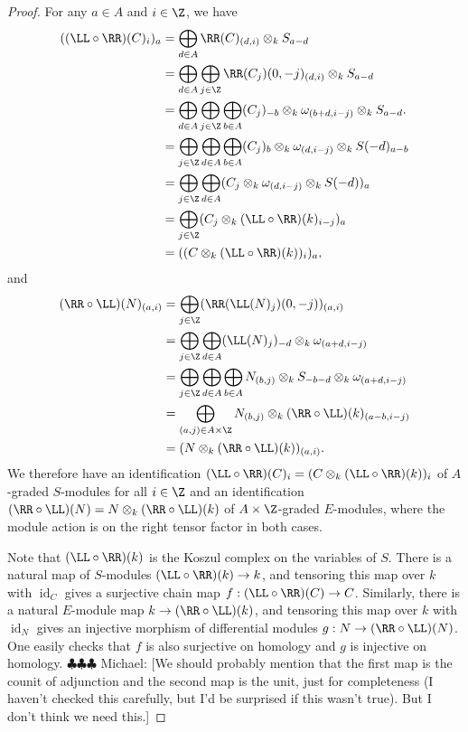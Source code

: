 \documentclass[12pt]{amsart}
\theoremstyle{definition}
\theoremstyle{remark}
\newcommand{\id}{\operatorname{id}}
\newcommand{\michael}[1]{{\color{red} \sf $\clubsuit\clubsuit\clubsuit$ Michael: [#1]}}
\def\om{\omega}
\def\om{\omega}
\begin{document}
\begin{proof}
For any $a \in A$ and $i \in \Z$, we have
\begin{align*}
((\LL \circ \RR)(C)_i)_a &= \bigoplus_{d \in A} \RR(C)_{(d, i)} \otimes_k S_{a - d} \\
&= \bigoplus_{d \in A} \bigoplus_{j \in \Z} \RR(C_j)(0, -j)_{(d, i)} \otimes_k S_{a - d} \\
&= \bigoplus_{d \in A} \bigoplus_{j \in \Z} \bigoplus_{b \in A} (C_j)_{-b} \otimes_k \om_{(b + d, i - j)} \otimes_k S_{a - d}. \\
&= \bigoplus_{j \in \Z} \bigoplus_{d \in A} \bigoplus_{b \in A} (C_j)_b \otimes_k   \om_{(d, i - j)} \otimes_k S(-d)_{a - b} \\
&= \bigoplus_{j \in \Z} \bigoplus_{d \in A} (C_j \otimes_k   \om_{(d, i - j)} \otimes_k S(-d))_a \\
&= \bigoplus_{j \in \Z} (C_j \otimes_k  (\LL \circ \RR)(k)_{i - j} )_a \\
&= ((C \otimes_k  (\LL \circ \RR)(k))_i)_a,
\end{align*}
and 
\begin{align*}
(\RR \circ \LL)(N)_{(a, i)} &= \bigoplus_{j \in \Z} (\RR(\LL(N)_j)(0, -j))_{(a, i)} \\
&= \bigoplus_{j \in \Z}  \bigoplus_{d \in A} (\LL(N)_j)_{-d} \otimes_k \om_{(a + d, i-j)} \\
&= \bigoplus_{j \in \Z}  \bigoplus_{d \in A} \bigoplus_{b \in A} N_{(b,j)} \otimes_k S_{-b-d} \otimes_k \om_{(a + d, i-j)} \\
&= \bigoplus_{(a,j) \in A \times \Z} N_{(b,j)} \otimes_k (\RR \circ \LL)(k)_{(a-b,i-j)} \\
&= (N \otimes_k (\RR \circ \LL)(k))_{(a, i)}.
\end{align*}
We therefore have an identification $(\LL \circ \RR)(C)_i = (C \otimes_k  (\LL \circ \RR)(k))_i$ of $A$-graded $S$-modules for all $i \in \Z$ and an identification $(\RR \circ \LL)(N) = N \otimes_k (\RR \circ \LL)(k)$ of $A \times \Z$-graded $E$-modules, where the module action is on the right tensor factor in both cases.

Note that $(\LL \circ \RR)(k)$ is the Koszul complex on the variables of $S$. There is a natural map of $S$-modules $(\LL \circ \RR)(k) \to k$, and tensoring this map over $k$ with $\id_C$ gives a surjective chain map $f: (\LL \circ \RR)(C) \to C$. Similarly, there is a natural $E$-module map $k \to (\RR \circ \LL)(k)$, and tensoring this map over $k$ with $\id_N$ gives an injective morphism of differential modules $g: N \to (\RR \circ \LL)(N)$. One easily checks that $f$ is also surjective on homology and $g$ is injective on homology. \michael{We should probably mention that the first map is the counit of adjunction and the second map is the unit, just for completeness (I haven't checked this carefully, but I'd be surprised if this wasn't true). But I don't think we need this.}


\end{proof}
\end{document}
